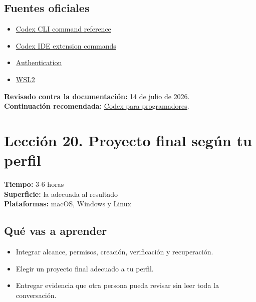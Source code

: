 \documentclass[10pt,a4paper,openany]{book}
\providecommand{\tightlist}{\setlength{\itemsep}{0.18em}\setlength{\parskip}{0pt}}
\begin{document}
\subsection{Fuentes oficiales}\label{fuentes-oficiales-18}

\begin{itemize}
\tightlist
\item
  \href{https://learn.chatgpt.com/docs/developer-commands?surface=cli}{Codex
  CLI command reference}
\item
  \href{https://learn.chatgpt.com/docs/developer-commands?surface=ide}{Codex
  IDE extension commands}
\item
  \href{https://learn.chatgpt.com/docs/auth}{Authentication}
\item
  \href{https://learn.chatgpt.com/docs/windows/wsl}{WSL2}
\end{itemize}

\textbf{Revisado contra la documentación:} 14 de julio de 2026.\\
\textbf{Continuación recomendada:}
\href{https://www.aulafy.net/cursos/codex-programadores}{Codex para
programadores}.

\clearpage

\section{Lección 20. Proyecto final según tu
perfil}\label{lecciuxf3n-20.-proyecto-final-seguxfan-tu-perfil}

\begin{metabox}

\textbf{Tiempo:} 3-6 horas\\
\textbf{Superficie:} la adecuada al resultado\\
\textbf{Plataformas:} macOS, Windows y Linux

\end{metabox}

\subsection{Qué vas a aprender}\label{quuxe9-vas-a-aprender-19}

\begin{itemize}
\tightlist
\item
  Integrar alcance, permisos, creación, verificación y recuperación.
\item
  Elegir un proyecto final adecuado a tu perfil.
\item
  Entregar evidencia que otra persona pueda revisar sin leer toda la
  conversación.
\end{itemize}
\end{document}
